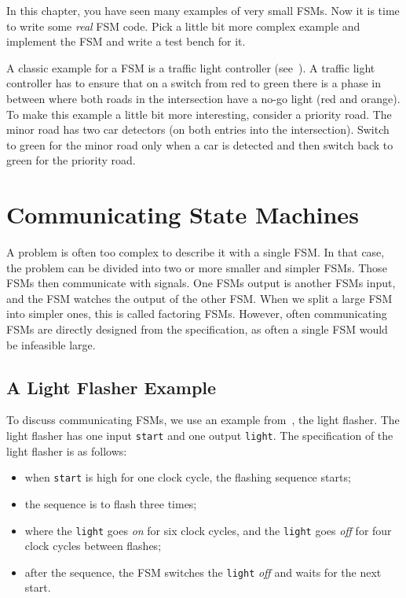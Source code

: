 \documentclass[%
    10pt,
    headinclude, footexclude,
    openright, %
    notitlepage,
    cleardoubleempty,
    headsepline,
    pointlessnumbers,
    bibtotoc, idxtotoc,
    ]{scrbook}
\newcommand{\code}[1]{{\small{\texttt{#1}}}}
\newcommand{\todo}[1]{{\emph{TODO: #1}}}
\renewcommand{\todo}[1]{}
\begin{document}
In this chapter, you have seen many examples of very small FSMs.
Now it is time to write some \emph{real} FSM code.
Pick a little bit more complex example and implement the FSM and
write a test bench for it.

A classic example for a FSM is a traffic light controller (see~\cite[Section~14.3]{dally:vhdl:2016}).
A traffic light controller has to ensure that on a switch from red to green
there is a phase in between where both roads in the intersection
have a no-go light (red and orange).
To make this example a little bit more interesting, consider a priority road.
The minor road has two car detectors (on both entries into the intersection).
Switch to green for the minor road only when a car is detected and then switch
back to green for the priority road.

\todo{Luca: Greatest common divisor with Euclide algorithm can be also a nice exercise.
Martin: but this is shown at the Chisel homepage without an FSM.}

\chapter{Communicating State Machines}

A problem is often too complex to describe it with a single FSM.
In that case, the problem can be divided into two or more smaller and simpler FSMs.
Those FSMs then communicate with signals. One FSMs output is
another FSMs input, and the FSM watches the output of the other FSM.
When we split a large FSM into simpler ones, this is called factoring FSMs.
However, often communicating FSMs are directly designed from the specification,
as often a single FSM would be infeasible large.

\section{A Light Flasher Example}

To discuss communicating FSMs, we use an example
from~\cite[Chapter~17]{dally:vhdl:2016}, the light flasher.
The light flasher has one input \code{start} and one output
\code{light}. The specification of the light flasher is as follows:
\begin{itemize}
\item when \code{start} is high for one clock cycle, the flashing
sequence starts;
\item the sequence is to flash three times;
\item where the \code{light} goes \emph{on} for six clock cycles, and the \code{light} goes \emph{off} for four clock cycles between flashes;
\item after the sequence, the FSM switches the \code{light} \emph{off} and waits
for the next start.
\end{itemize}
\end{document}
